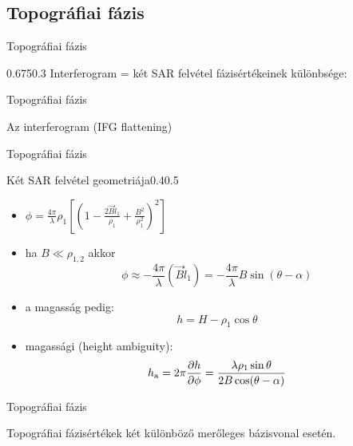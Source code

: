 \def\ft{Topográfiai fázis}
\subsection{\ft}

\begin{frame}{\ft}
    \begin{figp}{}{}{0.675}{0.3}
        Interferogram = két SAR felvétel fázisértékeinek különbsége:
    \end{figp}
\end{frame}


\begin{frame}{\ft}
    \begin{minic}{0.6}
        \centering
        
        Az interferogram  (IFG flattening)
    \end{minic}
\end{frame}


\begin{frame}{\ft}
    \begin{figp}{}{Két SAR felvétel geometriája}{0.4}{0.5}
        \begin{itemize}
            \item $\phi = \frac{4\pi}{\lambda}\rho_1\left[\left(1 - \frac{2 \vec{B}\hat{l}_1}{\rho_1} + \frac{B^2}{\rho_1^2}\right)^2\right]$
            \item ha $B \ll \rho_{1,2}$ akkor $$\phi \approx - \frac{4\pi}{\lambda} (\vec{B}\hat{l}_1) = - \frac{4\pi}{\lambda} B \sin(\theta - \alpha)$$
            \item a magasság pedig: $$h = H - \rho_1 \cos\theta$$
            \item magassági  (height ambiguity): $$h_{\text{a}} = 2\pi \frac{\partial h}{\partial \phi} = \frac{\lambda\rho_1\sin\theta}{2B\cos(\theta - \alpha)}$$
        \end{itemize}
    \end{figp}
\end{frame}


\begin{frame}{\ft}
    \begin{center}
    \begin{minipage}[c]{0.45\textwidth}
    \end{minipage}
    \hspace{10pt}
    \begin{minipage}[c]{0.45\textwidth}
    \end{minipage}
    \centering
    
    Topográfiai fázisértékek két különböző merőleges bázisvonal esetén.
    \end{center}
\end{frame}

